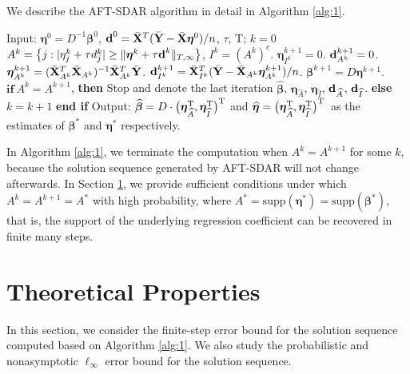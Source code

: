\documentclass[12pt]{article}
\renewcommand{\hat}{\widehat}
\newcommand{\bX}{{\bf X}}
\newcommand{\bd}{\mbox{\bf d}}
\newcommand{\bY}{\mbox{\bf Y}}
\newcommand{\bbeta}{\boldsymbol{\beta}}
\newcommand{\boldeta}{\boldsymbol{\eta}}
\begin{document}
We describe the AFT-SDAR algorithm in detail in  Algorithm \ref{alg:1}.
\begin{algorithm}[!ht]
	\caption{AFT-SDAR}
    \label{alg:1}
	\begin{algorithmic}[1]
\STATE Input: $\boldeta^0=D^{-1}\bbeta^0$, $\bd^0=\bar{\bX}^T(\bar{\bY}-\bar{\bX}\boldeta^0)/n$, $\tau$, T; $k=0$
\STATE $A^k=\big{\{}j:|\eta^k_j+\tau d^k_{j}|\geq\|\boldeta^k+\tau \bd^k\|_{T,\infty}\big{\}}$, $I^{k}=(A^{k})^c$.
\STATE $\boldeta^{k+1}_{I^k}=0$.
\STATE $\bd^{k+1}_{A^k}=0$. \STATE $\boldeta^{k+1}_{A^{k}}=(\bar{\bX}_{A^k}^{T}\bar{\bX}_{A^k})^{-1}\bar{\bX}_{A^k}^{T}\bar{\bY}$.
\STATE $\bd^{k+1}_{I^{k}}=\bar{\bX}_{I^k}^{T}(\bar{\bY}-\bar{\bX}_{A^k}\boldeta_{A^k}^{k+1})/n$.
\STATE $\bbeta^{k+1}=D\boldeta^{k+1}$.
\STATE $\textbf{if}~A^{k}=A^{k+1}$, \textbf{then}
\STATE Stop and denote the last iteration $\hat{\bbeta}$, $\boldeta_{\hat{A}}$, $\boldeta_{\hat{I}}$, $\bd_{\hat{A}}$, $\bd_{\hat{I}}$.
\STATE \textbf{else}
\STATE $k=k+1$
\STATE \textbf{end if}
\ENDFOR
\STATE Output:  $\hat{\bbeta}=D\cdot\big{(}\boldeta^{\mathrm{T}}_{\hat{A}}, \boldeta^{\mathrm{T}}_{\hat {I}}\big{)}^{\mathrm{T}}$ and $\hat{\boldeta}=\big{(}\boldeta^{\mathrm{T}}_{\hat {A}}, \boldeta^{\mathrm{T}}_{\hat {I}}\big{)}^{\mathrm{T}}$~as the estimates of $\bbeta^*$ and $\boldeta^*$ respectively.
\end{algorithmic}
\end{algorithm}

In Algorithm \ref{alg:1}, we terminate the computation when $A^{k}=A^{k+1}$ for some $k$, because the solution sequence generated by AFT-SDAR will not change afterwards. In Section \ref{sec:2}, we provide sufficient conditions under which
$A^{k}=A^{k+1}=A^*$ with high probability, where $A^*=\text{supp}(\boldeta^*)=\text{supp}(\bbeta^*)$,
that is, the support of the underlying regression coefficient can be recovered in finite many steps.
\section{Theoretical Properties}
\label{sec:2}
In this section, we consider the finite-step error bound for the solution sequence computed based on Algorithm \ref{alg:1}.
We also study the probabilistic and nonasymptotic $\ell_{\infty}$  error bound
for the solution sequence.
\end{document}
